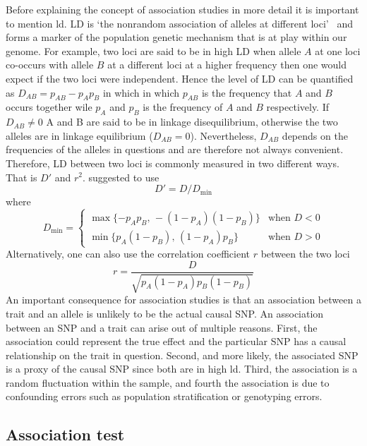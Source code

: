 \documentclass[../header.tex]{subfiles}
\begin{document}
Before explaining the concept of association studies in more detail it is important to mention \acrfull{ld}.
LD is `the nonrandom association of alleles at different loci'~\cite{Slatkin2008} and forms a marker of the population genetic mechanism that is at play within our genome.
For example, two loci are said to be in high LD when allele $A$ at one loci co-occurs with allele $B$ at a different loci at a higher frequency then one would expect if the two loci were independent.
Hence the level of LD can be quantified as $D_{AB}=p_{AB} - p_{A}p_{B}$ in which in which $p_{AB}$ is the frequency that $A$ and $B$ occurs together wile $p_A$ and $p_B$ is the frequency of $A$ and $B$ respectively.
If $D_{AB} \neq 0$ A and B are said to be in linkage disequilibrium, otherwise the two alleles are in linkage equilibrium ($D_{AB}=0$).
Nevertheless, $D_{AB}$ depends on the frequencies of the alleles in questions and are therefore not always convenient.
Therefore, LD between two loci is commonly measured in two different ways. 
That is $D'$ and $r^2$.
\citet{Lewontin1964} suggested to use
\begin{equation}\label{eq:dprime}
  D' = D/D_{\min}
\end{equation}
where 
\begin{equation*}
  D_{\min}= \begin{cases}
    \max\{-p_A p_B,\,-(1-p_A)(1-p_B)\} & \text{when } D < 0\\
    \min\{p_A (1-p_B),\,(1-p_A) p_B\} & \text{when } D > 0
  \end{cases} 
\end{equation*}
Alternatively, one can also use the correlation coefficient $r$ between the two loci 
\begin{equation}\label{eq:r2}
  r=\frac{D}{\sqrt{p_A(1-p_A)p_B (1-p_B)}}
\end{equation}
An important consequence for association studies is that an association between a trait and an allele is unlikely to be the actual causal SNP\@.
An association between an SNP and a trait can arise out of multiple reasons.
First, the association could represent the true effect and the particular SNP has a causal relationship on the trait in question.
Second, and more likely, the associated SNP is a proxy of the causal SNP since both are in high \acrshort{ld}.
Third, the association is a random fluctuation within the sample, and 
fourth the association is due to confounding errors such as population stratification or genotyping errors.

\subsection{Association test}
\label{sub:association_test}
\end{document}
